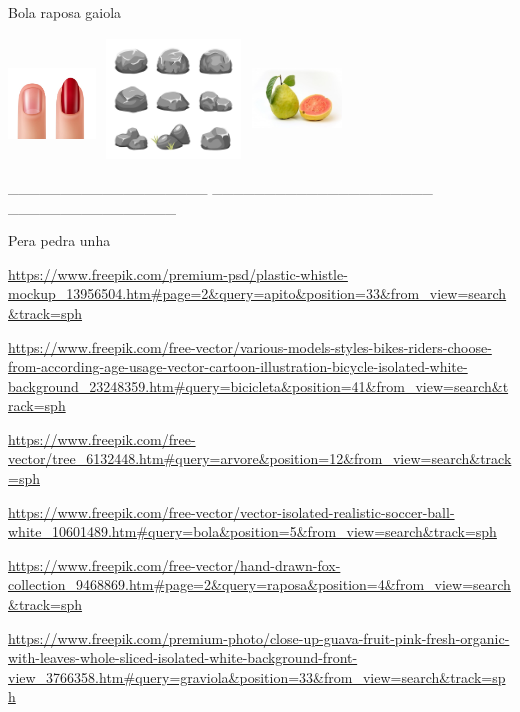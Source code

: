 {{Bola raposa gaiola

\includegraphics[width=0.91319in,height=1.16319in]{media/image55.jpeg}\includegraphics[width=1.62569in,height=1.25000in]{media/image56.jpeg}\includegraphics[width=0.93990in,height=1.27885in]{media/image57.jpeg}

\_\_\_\_\_\_\_\_\_\_\_\_\_\_\_\_\_\_\_
\_\_\_\_\_\_\_\_\_\_\_\_\_\_\_\_\_\_\_\_\_
\_\_\_\_\_\_\_\_\_\_\_\_\_\_\_\_

Pera pedra unha

\url{https://www.freepik.com/premium-psd/plastic-whistle-mockup_13956504.htm\#page=2\&query=apito\&position=33\&from_view=search\&track=sph}

\url{https://www.freepik.com/free-vector/various-models-styles-bikes-riders-choose-from-according-age-usage-vector-cartoon-illustration-bicycle-isolated-white-background_23248359.htm\#query=bicicleta\&position=41\&from_view=search\&track=sph}

\url{https://www.freepik.com/free-vector/tree_6132448.htm\#query=arvore\&position=12\&from_view=search\&track=sph}

\url{https://www.freepik.com/free-vector/vector-isolated-realistic-soccer-ball-white_10601489.htm\#query=bola\&position=5\&from_view=search\&track=sph}

\url{https://www.freepik.com/free-vector/hand-drawn-fox-collection_9468869.htm\#page=2\&query=raposa\&position=4\&from_view=search\&track=sph}

\url{https://www.freepik.com/premium-photo/close-up-guava-fruit-pink-fresh-organic-with-leaves-whole-sliced-isolated-white-background-front-view_3766358.htm\#query=graviola\&position=33\&from_view=search\&track=sph}

}}

